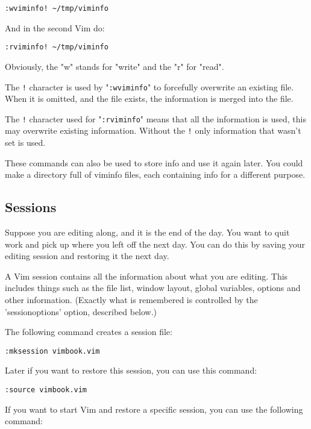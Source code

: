 \begin{Verbatim}[samepage=true]
 :wviminfo! ~/tmp/viminfo
\end{Verbatim}

And in the second Vim do:

\begin{Verbatim}[samepage=true]
 :rviminfo! ~/tmp/viminfo
\end{Verbatim}

Obviously, the "w" stands for "write" and the "r" for "read".

The \verb:!: character is used by "\verb!:wviminfo!" to forcefully overwrite an existing file.
When it is omitted, and the file exists, the information is merged into the file.

The \verb:!: character used for "\verb!:rviminfo!" means that all the information is used, this may overwrite existing information.
Without the \verb:!: only information that wasn't set is used.

These commands can also be used to store info and use it again later.
You could make a directory full of viminfo files, each containing info for a different purpose.
\subsection{Sessions}
Suppose you are editing along, and it is the end of the day.
You want to quit work and pick up where you left off the next day.
You can do this by saving your editing session and restoring it the next day.

A Vim session contains all the information about what you are editing.
This includes things such as the file list, window layout, global variables, options and other information.
(Exactly what is remembered is controlled by the 'sessionoptions' option, described below.)

The following command creates a session file:

\begin{Verbatim}[samepage=true]
 :mksession vimbook.vim
\end{Verbatim}

Later if you want to restore this session, you can use this command:

\begin{Verbatim}[samepage=true]
 :source vimbook.vim
\end{Verbatim}

If you want to start Vim and restore a specific session, you can use the following command:

